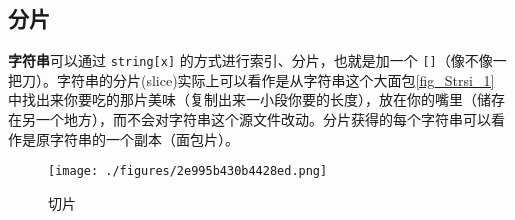 
\subsection{分片}

\textbf{字符串}可以通过 \verb|string[x]| 的方式进行索引、分片，也就是加一个 \verb|[]|（像不像一把刀）。字符串的分片(slice)实际上可以看作是从字符串这个大面包\autoref{fig_Strsi_1} 中找出来你要吃的那片美味（复制出来一小段你要的长度），放在你的嘴里（储存在另一个地方），而不会对字符串这个源文件改动。分片获得的每个字符串可以看作是原字符串的一个副本（面包片）。
\begin{figure}[ht]
\centering
\texttt{[image: ./figures/2e995b430b4428ed.png]}
\caption{切片} \label{fig_Strsi_1}
\end{figure}

